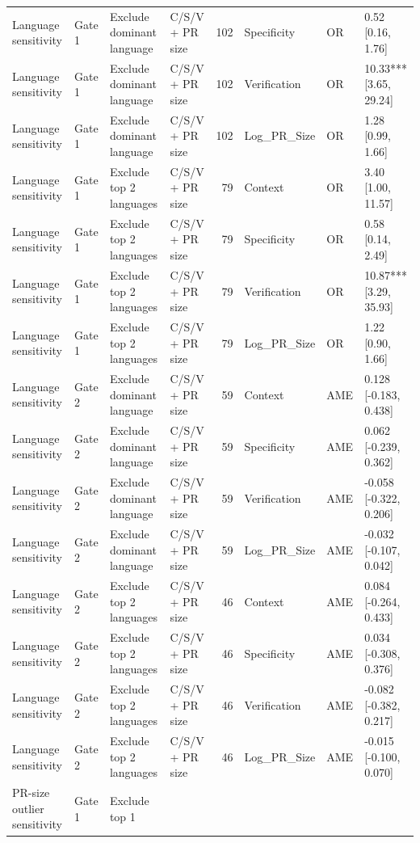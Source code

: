 \begin{table}
\begin{tabular}{llllrlll}
Language sensitivity & Gate 1 & Exclude dominant language & C/S/V + PR size & 102 & Specificity & OR & 0.52 [0.16, 1.76] \\
Language sensitivity & Gate 1 & Exclude dominant language & C/S/V + PR size & 102 & Verification & OR & 10.33*** [3.65, 29.24] \\
Language sensitivity & Gate 1 & Exclude dominant language & C/S/V + PR size & 102 & Log_PR_Size & OR & 1.28 [0.99, 1.66] \\
Language sensitivity & Gate 1 & Exclude top 2 languages & C/S/V + PR size & 79 & Context & OR & 3.40 [1.00, 11.57] \\
Language sensitivity & Gate 1 & Exclude top 2 languages & C/S/V + PR size & 79 & Specificity & OR & 0.58 [0.14, 2.49] \\
Language sensitivity & Gate 1 & Exclude top 2 languages & C/S/V + PR size & 79 & Verification & OR & 10.87*** [3.29, 35.93] \\
Language sensitivity & Gate 1 & Exclude top 2 languages & C/S/V + PR size & 79 & Log_PR_Size & OR & 1.22 [0.90, 1.66] \\
Language sensitivity & Gate 2 & Exclude dominant language & C/S/V + PR size & 59 & Context & AME & 0.128 [-0.183, 0.438] \\
Language sensitivity & Gate 2 & Exclude dominant language & C/S/V + PR size & 59 & Specificity & AME & 0.062 [-0.239, 0.362] \\
Language sensitivity & Gate 2 & Exclude dominant language & C/S/V + PR size & 59 & Verification & AME & -0.058 [-0.322, 0.206] \\
Language sensitivity & Gate 2 & Exclude dominant language & C/S/V + PR size & 59 & Log_PR_Size & AME & -0.032 [-0.107, 0.042] \\
Language sensitivity & Gate 2 & Exclude top 2 languages & C/S/V + PR size & 46 & Context & AME & 0.084 [-0.264, 0.433] \\
Language sensitivity & Gate 2 & Exclude top 2 languages & C/S/V + PR size & 46 & Specificity & AME & 0.034 [-0.308, 0.376] \\
Language sensitivity & Gate 2 & Exclude top 2 languages & C/S/V + PR size & 46 & Verification & AME & -0.082 [-0.382, 0.217] \\
Language sensitivity & Gate 2 & Exclude top 2 languages & C/S/V + PR size & 46 & Log_PR_Size & AME & -0.015 [-0.100, 0.070] \\
PR-size outlier sensitivity & Gate 1 & Exclude top 1%

\end{tabular}
\end{table}
